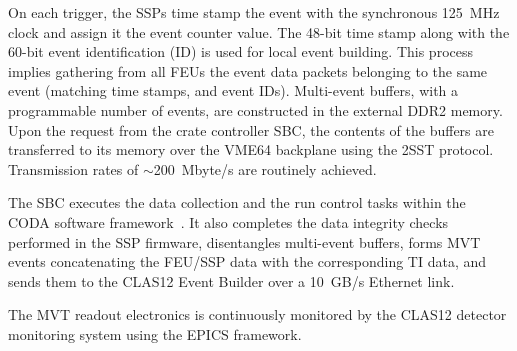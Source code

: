 On each trigger, the SSPs time stamp the event with the synchronous 125~MHz clock and assign it the event counter value.
The 48-bit time stamp along with the 60-bit event identification (ID) is used for local event building. This process implies
gathering from all FEUs the event data packets belonging to the same event (matching time stamps, and event IDs).
Multi-event buffers, with a programmable number of events, are constructed in the external DDR2 memory. Upon the
request from the crate controller SBC, the contents of the buffers are transferred to its memory over the VME64
backplane using the 2SST protocol. Transmission rates of $\sim$200~Mbyte/s are routinely achieved.

The SBC executes the data collection and the run control tasks within the CODA software framework~\cite{daq-nim}. It 
also completes the data integrity checks performed in the SSP firmware, disentangles multi-event buffers, forms MVT
events concatenating the FEU/SSP data with the corresponding TI data, and sends them to the CLAS12 Event Builder over
a 10~GB/s Ethernet link.

The MVT readout electronics is continuously monitored by the CLAS12 detector monitoring system using the EPICS
framework.
